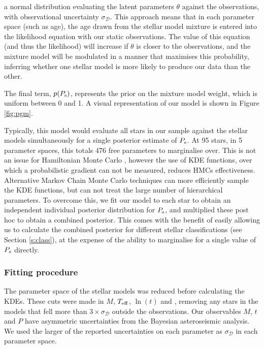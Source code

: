 \noindent a normal distribution evaluating the latent parameters $\theta$ against the observations, with observational uncertainty $\sigma_{\mathcal{D}}$. This approach means that in each parameter space (such as age), the age drawn from the stellar model mixture is entered into the likelihood equation with our static observations. The value of this equation (and thus the likelihood) will increase if $\theta$ is closer to the observations, and the mixture model will be modulated in a manner that maximises this probability, inferring whether one stellar model is more likely to produce our data than the other.

The final term, $p(P_{\rm s})$, represents the prior on the mixture model weight, which is uniform between 0 and 1. A visual representation of our model is shown in Figure \ref{fig:pgm}.

Typically, this model would evaluate all stars in our sample against the stellar models simultaneously for a single posterior estimate of $P_{\rm s}$. At 95 stars, in 5 parameter spaces, this totals 476 free parameters to marginalise over. This is not an issue for Hamiltonian Monte Carlo \cite[HMC]{betancourt+girolami2013}, however the use of KDE functions, over which a probabilistic gradient can not be measured, reduces HMCs effectiveness. Alternative Markov Chain Monte Carlo techniques \cite[MCMC]{foreman-mackey+2013} can more efficiently sample the KDE functions, but can not treat the large number of hierarchical parameters. To overcome this, we fit our model to each star to obtain an independent individual posterior distribution for $P_{\rm s}$, and multiplied these post hoc to obtain a combined posterior. This comes with the benefit of easily allowing us to calculate the combined posterior for different stellar classifications (see Section \ref{s:class}), at the expense of the ability to marginalise for a single value of $P_{\rm s}$ directly. 

\subsubsection{Fitting procedure}
The parameter space of the stellar models was reduced before calculating the KDEs. These cuts were made in $M$, $\mbox{$T_{\rm eff}$}$, $\ln(t)$ and \feh, removing any stars in the models that fell more than $3 \times \sigma_{\mathcal{D}}$ outside the observations. Our observables $M$, $t$ and $P$ have asymmetric uncertainties from the Bayesian asteroseismic analysis. We used the larger of the reported uncertainties on each parameter as $\sigma_{\mathcal{D}}$ in each parameter space. 

